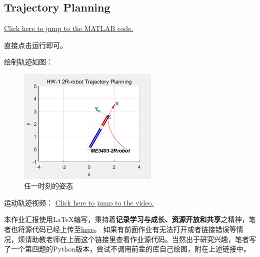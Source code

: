 \documentclass{ctexart}
\begin{document}
\subsection{Trajectory Planning}
\href{src/Rhw1_4_main.m}{Click here to jump to the MATLAB code.}

直接点击运行即可。

绘制轨迹如图：

\begin{figure}[h]
	\centering
	\includegraphics[width=0.6\textwidth]{Image/trajectory.png}
	\caption{任一时刻的姿态}
\end{figure}

运动轨迹视频：
\href{src/robot_trajectory.avi}{Click here to jump to the video.}

本作业汇报使用\LaTeX 编写，秉持着\textbf{记录学习与成长、资源开放和共享}之精神，笔者也将源代码已经上传至\href{https://github.com/Racheus/Robotics-Caprice/tree/master/Homework1-2Rrobot-Kine}{here}。
如果有前面作业有无法打开或者链接错误等情况，烦请助教老师在上面这个链接里查看作业源代码。当然出于研究兴趣，笔者写了一个第四题的Python版本，尝试不调用前辈的库自己绘图，附在上述链接中。
\end{document}
